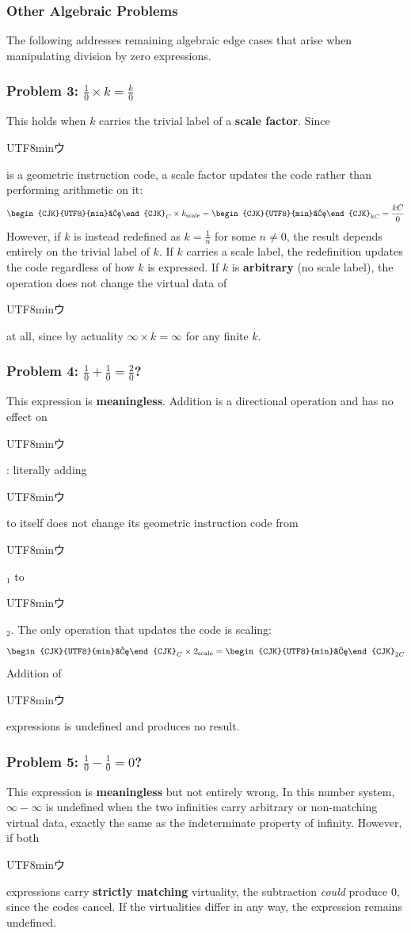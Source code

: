 \documentclass{article}
\newcommand{\U}{\begin{CJK}{UTF8}{min}ウ\end{CJK}}
\begin{document}
\subsubsection*{Other Algebraic Problems}

The following addresses remaining algebraic edge cases that arise when 
manipulating division by zero expressions.

\subsubsection*{Problem 3: $\frac{1}{0} \times k = \frac{k}{0}$}

This holds when $k$ carries the trivial label of a \textbf{scale factor}. 
Since \U{} is a geometric instruction code, a scale factor updates the 
code rather than performing arithmetic on it:
$$\text{\U}_C \times k_{\text{scale}} = \text{\U}_{kC} = \frac{kC}{0}$$
However, if $k$ is instead redefined as $k = \frac{1}{n}$ for some 
$n \neq 0$, the result depends entirely on the trivial label of $k$. 
If $k$ carries a scale label, the redefinition updates the code 
regardless of how $k$ is expressed. If $k$ is \textbf{arbitrary} 
(no scale label), the operation does not change the virtual data of 
\U{} at all, since by actuality $\infty \times k = \infty$ for any 
finite $k$.

\subsubsection*{Problem 4: $\frac{1}{0} + \frac{1}{0} = \frac{2}{0}$?}

This expression is \textbf{meaningless}. Addition is a directional 
operation and has no effect on \U{}: literally adding \U{} to itself 
does not change its geometric instruction code from \U$_1$ to \U$_2$. 
The only operation that updates the code is scaling:
$$\text{\U}_C \times 2_{\text{scale}} = \text{\U}_{2C}$$
Addition of \U{} expressions is undefined and produces no result.

\subsubsection*{Problem 5: $\frac{1}{0} - \frac{1}{0} = 0$?}

This expression is \textbf{meaningless} but not entirely wrong. In this 
number system, $\infty - \infty$ is undefined when the two infinities 
carry arbitrary or non-matching virtual data, exactly the same as the indeterminate property of infinity. However, if both \U{} expressions carry 
\textbf{strictly matching} virtuality, the subtraction \textit{could} 
produce $0$, since the codes cancel. If the virtualities differ in any 
way, the expression remains undefined.
\end{document}

